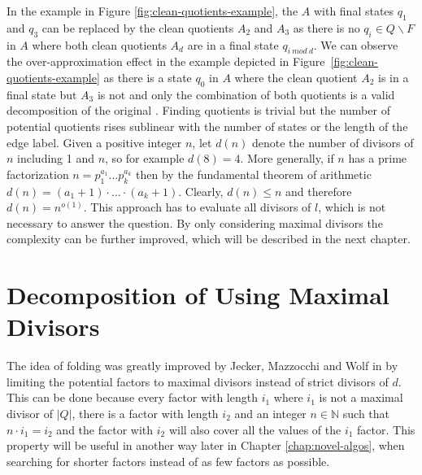 In the example in Figure \ref{fig:clean-quotients-example}, the \DFA $A$ with final states $q_1$ and $q_3$ can be replaced by the clean quotients $A_2$ and $A_3$ as there is no $q_i \in Q \backslash F$ in $A$ where both clean quotients $A_d$ are in a final state $q_{i ~mod~ d}$.
We can observe the over-approximation effect in the example depicted in Figure~\ref{fig:clean-quotients-example} as there is a state $q_0$ in $A$ where the clean quotient $A_2$ is in a final state but $A_3$ is not and only the combination of both quotients is a valid decomposition of the original \DFA.
Finding quotients is trivial but the number of potential quotients rises sublinear with the number of states or the length of the edge label.
Given a positive integer $n$, let $d(n)$ denote the number of divisors of $n$ including 1 and $n$, so for example $d(8)=4$.
More generally, if $n$ has a prime factorization $n = p_1^{a_1} \ldots p_k^{a_k}$ then by the fundamental theorem of arithmetic $d(n) = (a_1+1) \cdot \ldots \cdot (a_k+1)$.
Clearly, $d(n) \leq n$ and therefore $d(n) = n^{o(1)}$.
This approach has to evaluate all divisors of $l$, which is not necessary to answer the {} question.
By only considering maximal divisors the complexity can be further improved, which will be described in the next chapter.

\section{Decomposition of \DFAs Using Maximal Divisors}
\label{ch:analysis:max-divisors}
The idea of folding \DFAs was greatly improved by Jecker, Mazzocchi and Wolf in \cite{DBLP:journals/corr/abs-2107-04683} by limiting the potential factors to maximal divisors instead of strict divisors of $d$.
This can be done because every factor with length $i_1$ where $i_1$ is not a maximal divisor of $|Q|$, there is a factor with length $i_2$ and an integer $n \in \mathbb{N}$ such that $n \cdot i_1 = i_2$ and the factor with $i_2$ will also cover all the values of the $i_1$ factor.
This property will be useful in another way later in Chapter \ref{chap:novel-algos}, when searching for shorter factors instead of as few factors as possible.

